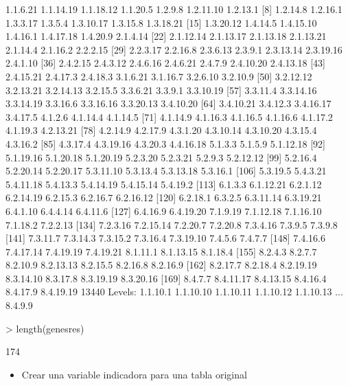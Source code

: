 \documentclass[12pt]{article}
\begin{document}
\begin{Schunk}
\begin{Soutput}
  [1] 1.1.6.21  1.1.14.19 1.1.18.12 1.1.20.5  1.2.9.8   1.2.11.10 1.2.13.1 
  [8] 1.2.14.8  1.2.16.1  1.3.3.17  1.3.5.4   1.3.10.17 1.3.15.8  1.3.18.21
 [15] 1.3.20.12 1.4.14.5  1.4.15.10 1.4.16.1  1.4.17.18 1.4.20.9  2.1.4.14 
 [22] 2.1.12.14 2.1.13.17 2.1.13.18 2.1.13.21 2.1.14.4  2.1.16.2  2.2.2.15 
 [29] 2.2.3.17  2.2.16.8  2.3.6.13  2.3.9.1   2.3.13.14 2.3.19.16 2.4.1.10 
 [36] 2.4.2.15  2.4.3.12  2.4.6.16  2.4.6.21  2.4.7.9   2.4.10.20 2.4.13.18
 [43] 2.4.15.21 2.4.17.3  2.4.18.3  3.1.6.21  3.1.16.7  3.2.6.10  3.2.10.9 
 [50] 3.2.12.12 3.2.13.21 3.2.14.13 3.2.15.5  3.3.6.21  3.3.9.1   3.3.10.19
 [57] 3.3.11.4  3.3.14.16 3.3.14.19 3.3.16.6  3.3.16.16 3.3.20.13 3.4.10.20
 [64] 3.4.10.21 3.4.12.3  3.4.16.17 3.4.17.5  4.1.2.6   4.1.14.4  4.1.14.5 
 [71] 4.1.14.9  4.1.16.3  4.1.16.5  4.1.16.6  4.1.17.2  4.1.19.3  4.2.13.21
 [78] 4.2.14.9  4.2.17.9  4.3.1.20  4.3.10.14 4.3.10.20 4.3.15.4  4.3.16.2 
 [85] 4.3.17.4  4.3.19.16 4.3.20.3  4.4.16.18 5.1.3.3   5.1.5.9   5.1.12.18
 [92] 5.1.19.16 5.1.20.18 5.1.20.19 5.2.3.20  5.2.3.21  5.2.9.3   5.2.12.12
 [99] 5.2.16.4  5.2.20.14 5.2.20.17 5.3.11.10 5.3.13.4  5.3.13.18 5.3.16.1 
[106] 5.3.19.5  5.4.3.21  5.4.11.18 5.4.13.3  5.4.14.19 5.4.15.14 5.4.19.2 
[113] 6.1.3.3   6.1.12.21 6.2.1.12  6.2.14.19 6.2.15.3  6.2.16.7  6.2.16.12
[120] 6.2.18.1  6.3.2.5   6.3.11.14 6.3.19.21 6.4.1.10  6.4.4.14  6.4.11.6 
[127] 6.4.16.9  6.4.19.20 7.1.9.19  7.1.12.18 7.1.16.10 7.1.18.2  7.2.2.13 
[134] 7.2.3.16  7.2.15.14 7.2.20.7  7.2.20.8  7.3.4.16  7.3.9.5   7.3.9.8  
[141] 7.3.11.7  7.3.14.3  7.3.15.2  7.3.16.4  7.3.19.10 7.4.5.6   7.4.7.7  
[148] 7.4.16.6  7.4.17.14 7.4.19.19 7.4.19.21 8.1.11.1  8.1.13.15 8.1.18.4 
[155] 8.2.4.3   8.2.7.7   8.2.10.9  8.2.13.13 8.2.15.5  8.2.16.8  8.2.16.9 
[162] 8.2.17.7  8.2.18.4  8.2.19.19 8.3.14.10 8.3.17.8  8.3.19.19 8.3.20.16
[169] 8.4.7.7   8.4.11.17 8.4.13.15 8.4.16.4  8.4.17.9  8.4.19.19
13440 Levels: 1.1.10.1 1.1.10.10 1.1.10.11 1.1.10.12 1.1.10.13 ... 8.4.9.9
\end{Soutput}
\begin{Sinput}
> length(genesres)
\end{Sinput}
\begin{Soutput}
[1] 174
\end{Soutput}
\end{Schunk}

  \begin{itemize}
  \item Crear una variable indicadora para una tabla original
  \end{itemize}
  
\end{document}
